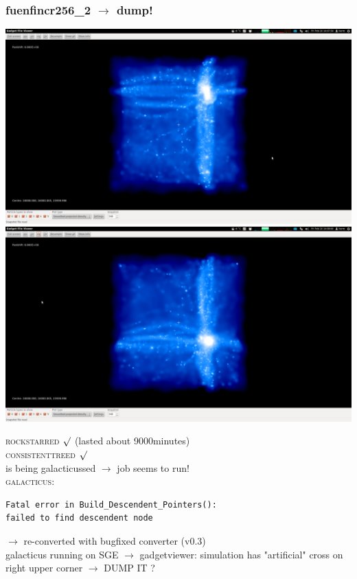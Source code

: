 \documentclass[a4paper,11pt,fleqn,oneside]{book}
\begin{document}
\newpage
\subsubsection{fuenfincr256\_2 $\rightarrow$ dump!}

\includegraphics[scale=0.12]{fuenfincr256_2/1.png} 
\includegraphics[scale=0.12]{fuenfincr256_2/2.png}

\textsc{rockstarred} $\surd$ (lasted about 9000minutes) \\
\textsc{consistenttreed} $\surd$ \\ 
is being galacticussed $\rightarrow$ job seems to run! \\
 \textsc{galacticus}:
 \begin{verbatim}
Fatal error in Build_Descendent_Pointers():
failed to find descendent node 
\end{verbatim}
$\rightarrow$ re-converted with bugfixed converter (v0.3) \\
galacticus running on SGE
$\rightarrow$ gadgetviewer: simulation has "artificial" cross on right upper corner $\rightarrow$ DUMP IT ?
\end{document}
